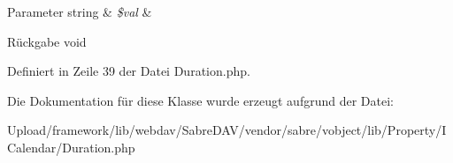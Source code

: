 \begin{DoxyParams}[1]{Parameter}
string & {\em \$val} & \\
\hline
\end{DoxyParams}
\begin{DoxyReturn}{Rückgabe}
void 
\end{DoxyReturn}


Definiert in Zeile 39 der Datei Duration.\+php.



Die Dokumentation für diese Klasse wurde erzeugt aufgrund der Datei\+:\begin{DoxyCompactItemize}
\item 
Upload/framework/lib/webdav/\+Sabre\+D\+A\+V/vendor/sabre/vobject/lib/\+Property/\+I\+Calendar/Duration.\+php\end{DoxyCompactItemize}
